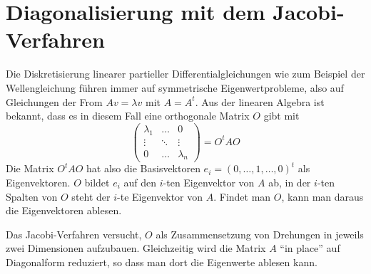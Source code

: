 %
%
%
\section{Diagonalisierung mit dem Jacobi-Verfahren
\label{buch:section:jacobi}}
%
Die Diskretisierung linearer partieller Differentialgleichungen wie
zum Beispiel
der Wellengleichung führen immer auf symmetrische Eigenwertprobleme,
also auf Gleichungen der From $Av=\lambda v$ mit $A=A^t$.
%
Aus der
linearen Algebra ist bekannt, dass es in diesem Fall eine orthogonale
Matrix $O$ gibt mit
%
%
\[
\begin{pmatrix}
\lambda_1&\dots&0\\
\vdots&\ddots&\vdots\\
0&\dots&\lambda_n
\end{pmatrix}=O^tAO
\]
Die Matrix $O^tAO$ hat also die Basisvektoren $e_i=(0,\dots,1,\dots,0)^t$
als Eigenvektoren. $O$ bildet $e_i$ auf den $i$-ten Eigenvektor von $A$
ab, in der $i$-ten Spalten von $O$ steht der $i$-te Eigenvektor von $A$.
Findet man $O$, kann man daraus die Eigenvektoren ablesen.

Das Jacobi-Verfahren versucht, $O$ als Zusammensetzung von Drehungen
in jeweils zwei Dimensionen aufzubauen.
Gleichzeitig wird die
Matrix $A$ ``in place'' auf Diagonalform reduziert, so dass man dort
die Eigenwerte ablesen kann.
%
%

